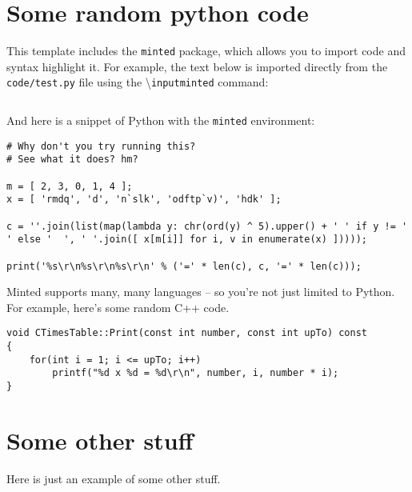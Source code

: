 %
\begin{appendices}


\chapter{Some random python code}
This template includes the \texttt{minted} package, which allows you to import code and syntax highlight it. For example, the text below is imported directly from the \texttt{code/test.py} file using the \textbackslash\texttt{inputminted} command:

\begin{framed}
\inputminted{python3}{code/test.py}
\end{framed}

And here is a snippet of Python with the \texttt{minted} environment:

\begin{framed}
\begin{verbatim}
# Why don't you try running this?
# See what it does? hm?

m = [ 2, 3, 0, 1, 4 ];
x = [ 'rmdq', 'd', 'n`slk', 'odftp`v)', 'hdk' ];

c = ''.join(list(map(lambda y: chr(ord(y) ^ 5).upper() + ' ' if y != ' ' else '  ', ' '.join([ x[m[i]] for i, v in enumerate(x) ]))));

print('%s\r\n%s\r\n%s\r\n' % ('=' * len(c), c, '=' * len(c)));
\end{verbatim}
\end{framed}

\cleardoublepage
Minted supports many, many languages -- so you're not just limited to Python. For example, here's some random C++ code.

\begin{framed}
\begin{verbatim}
void CTimesTable::Print(const int number, const int upTo) const
{
    for(int i = 1; i <= upTo; i++)
        printf("%d x %d = %d\r\n", number, i, number * i);
}
\end{verbatim}
\end{framed}








\chapter{Some other stuff}
Here is just an example of some other stuff.

\end{appendices}